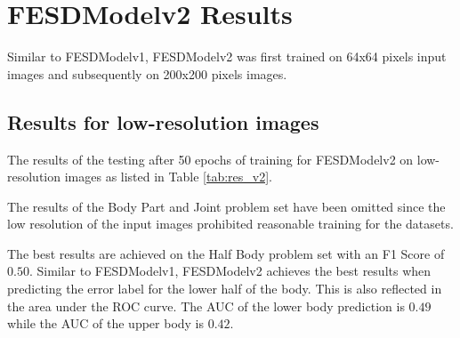 \section{FESDModelv2 Results}

Similar to FESDModelv1, FESDModelv2 was first trained on 64x64 pixels input images and subsequently on 200x200 pixels images.

\subsection{Results for low-resolution images}

The results of the testing after 50 epochs of training for FESDModelv2 on low-resolution images as listed in Table \ref{tab:res_v2}.

The results of the Body Part and Joint problem set have been omitted since the low resolution of the input images prohibited reasonable training for the datasets.



The best results are achieved on the Half Body problem set with an F1 Score of $0.50$. Similar to FESDModelv1, FESDModelv2 achieves the best results when predicting the error label for the lower half of the body. This is also reflected in the area under the ROC curve. The AUC of the lower body prediction is $0.49$ while the AUC of the upper body is $0.42$.

